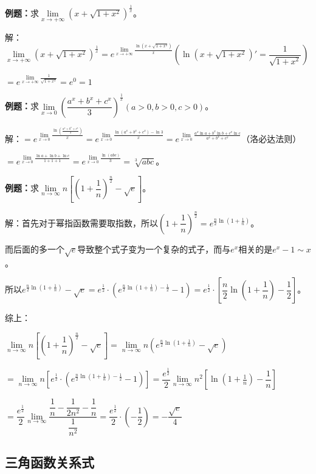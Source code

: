 \documentclass[UTF8, 12pt]{ctexart}
\begin{document}
\textbf{例题：}求$\lim\limits_{x\to+\infty}(x+\sqrt{1+x^2})^{\frac{1}{x}}$。

解：$\lim\limits_{x\to+\infty}(x+\sqrt{1+x^2})^{\frac{1}{x}}=e^{\lim\limits_{x\to+\infty}\frac{\ln(x+\sqrt{1+x^2})}{x}} \left(\ln(x+\sqrt{1+x^2})'=\dfrac{1}{\sqrt{1+x^2}}\right)$\medskip

$=e^{\lim\limits_{x\to+\infty}\frac{1}{\sqrt{1+x^2}}}=e^0=1$

\textbf{例题：}求$\lim\limits_{x\to 0}\left(\dfrac{a^x+b^x+c^x}{3}\right)^{\frac{1}{x}}(a>0,b>0,c>0)$。\medskip

解：$=e^{\lim\limits_{x\to 0}\frac{\ln\left(\frac{a^x+b^x+c^x}{3}\right)}{x}}=e^{\lim\limits_{x\to 0}\frac{\ln(a^x+b^x+c^x)-\ln 3}{x}}=e^{\lim\limits_{x\to 0}\frac{a^x\ln a+b^x\ln b+c^x\ln c}{a^x+b^x+c^x}}$（洛必达法则）

$=e^{\lim\limits_{x\to 0}\frac{\ln a+\ln b+\ln c}{1+1+1}}=e^{\lim\limits_{x\to 0}\frac{\ln(abc)}{3}}=\sqrt[3]{abc}$。\medskip

\textbf{例题：}求$\lim\limits_{n\to\infty}n\left[\left(1+\dfrac{1}{n}\right)^{\frac{n}{2}}-\sqrt{e}\right]$。

解：首先对于幂指函数需要取指数，所以$\left(1+\dfrac{1}{n}\right)^{\frac{n}{2}}=e^{\frac{n}{2}\ln(1+\frac{1}{n})}$。\medskip

而后面的多一个$\sqrt{e}$导致整个式子变为一个复杂的式子，而与$e^x$相关的是$e^x-1\sim x$。

所以$e^{\frac{n}{2}\ln(1+\frac{1}{n})}-\sqrt{e}=e^{\frac{1}{2}}\cdot\left(e^{\frac{n}{2}\ln(1+\frac{1}{n})-\frac{1}{2}}-1\right)=e^{\frac{1}{2}}\cdot\left[\dfrac{n}{2}\ln(1+\dfrac{1}{n})-\dfrac{1}{2}\right]$。

综上：

$\lim\limits_{n\to\infty}n\left[\left(1+\dfrac{1}{n}\right)^{\frac{n}{2}}-\sqrt{e}\right]=\lim\limits_{n\to\infty}n\left(e^{\frac{n}{2}\ln(1+\frac{1}{n})}-\sqrt{e}\right)$ \medskip

$=\lim\limits_{n\to\infty}n\left[e^{\frac{1}{2}}\cdot\left(e^{\frac{n}{2}\ln(1+\frac{1}{n})-\frac{1}{2}}-1\right)\right]=\dfrac{e^{\frac{1}{2}}}{2}\lim\limits_{n\to\infty}n^2\left[\ln\left(1+\frac{1}{n}\right)-\dfrac{1}{n}\right]$

$=\dfrac{e^{\frac{1}{2}}}{2}\lim\limits_{n\to\infty}\dfrac{\dfrac{1}{n}-\dfrac{1}{2n^2}-\dfrac{1}{n}}{\dfrac{1}{n^2}}=\dfrac{e^{\frac{1}{2}}}{2}\cdot\left(-\dfrac{1}{2}\right)=-\dfrac{\sqrt{e}}{4}$

\subsection{三角函数关系式}
\end{document}
